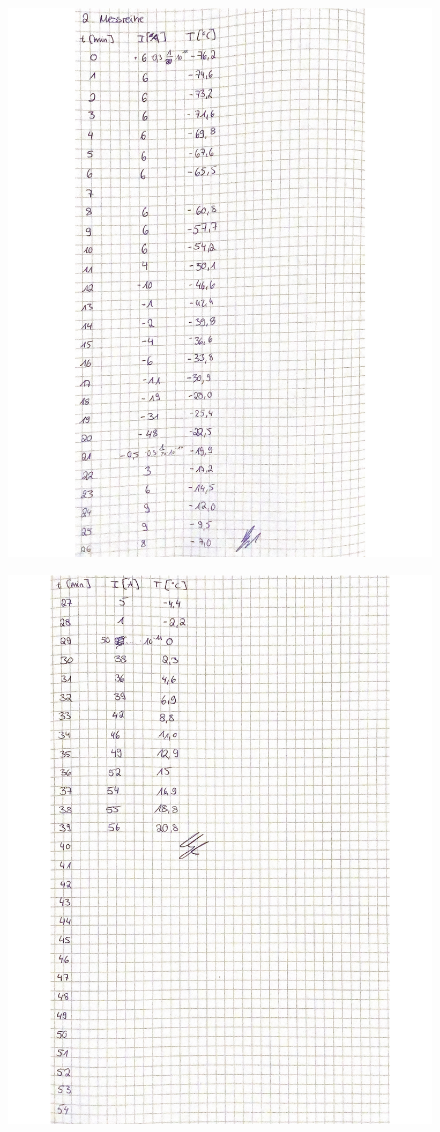  \begin{figure}[H]
   \centering
   \includegraphics[width=\textwidth]{Bilder/Daten5.pdf}
   \label{fig:Messungen_5}
 \end{figure}
 
 \begin{figure}[H]
   \centering
   \includegraphics[width=\textwidth]{Bilder/Daten6.pdf}
   \label{fig:Messungen_6}
 \end{figure}

